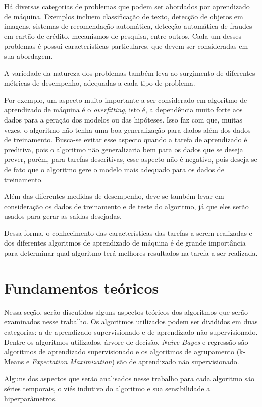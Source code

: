 \documentclass{article}
\begin{document}
Há diversas categorias de problemas que podem ser abordados por aprendizado de máquina. Exemplos incluem classificação de texto, detecção de objetos em imagens, sistemas de recomendação automática, detecção automática de fraudes em cartão de crédito, mecanismos de pesquisa, entre outros. Cada um desses problemas é possui características particulares, que devem ser consideradas em sua abordagem.

A variedade da natureza dos problemas também leva ao surgimento de diferentes métricas de desempenho, adequadas a cada tipo de problema.

Por exemplo, um aspecto muito importante a ser considerado em algoritmo de aprendizado de máquina é o {\it overfitting}, isto é, a dependência muito forte aos dados para a geração dos modelos ou das hipóteses. Isso faz com que, muitas vezes, o algoritmo não tenha uma boa generalização para dados além dos dados de treinamento. Busca-se evitar esse aspecto quando a tarefa de aprendizado é preditiva, pois o algoritmo não generalizaria bem para os dados que se deseja prever, porém, para tarefas descritivas, esse aspecto não é negativo, pois deseja-se de fato que o algoritmo gere o modelo mais adequado para os dados de treinamento.

Além das diferentes medidas de desempenho, deve-se também levar em consideração os dados de treinamento e de teste do algoritmo, já que eles serão usados para gerar as saídas desejadas.

Dessa forma, o conhecimento das características das tarefas a serem realizadas e dos diferentes algoritmos de aprendizado de máquina é de grande importância para determinar qual algoritmo terá melhores resultados na tarefa a ser realizada.

\section{Fundamentos teóricos}

Nessa seção, serão discutidos alguns aspectos teóricos dos algoritmos que serão examinados nesse trabalho. Os algoritmos utilizados podem ser divididos em duas categorias: a de aprendizado supervisionado e de aprendizado não supervisionado. Dentre os algoritmos utilizados, árvore de decisão, {\it Naive Bayes} e regressão são algoritmos de aprendizado supervisionado e os algoritmos de agrupamento (k-Means e {\it Expectation Maximization}) são de aprendizado não supervisionado.

Alguns dos aspectos que serão analisados nesse trabalho para cada algoritmo são séries temporais, o viés indutivo do algoritmo e sua sensibilidade a hiperparâmetros.
\end{document}
